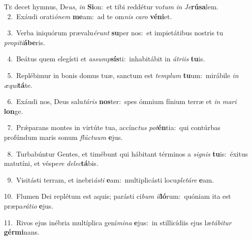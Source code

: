 \lettrine{\initial\textcolor{\initialcolor}{T}}{e} decet hymnus, De\-\textit{us}\-, \textit{in} \textbf{Si}\-on:~\star et tibi reddétur vo\textit{tum} \textit{in} \textit{Je}\-\textbf{rú}\textbf{sa}lem.\\
{\numbfont\textcolor{\numbcolor}{~2.}}~Exáudi orati\-\textit{ó}\-\textit{nem} \textbf{me}\-am:~\star ad te om\textit{nis} \textit{ca}\-\textit{ro} \textbf{vé}\-\textbf{ni}et.\par
{\numbfont\textcolor{\numbcolor}{~3.}}~Verba iniquórum prævalu\-\textit{é}\-\textit{runt} \textbf{su}\-per nos:~\star et impietátibus nostris tu \textit{pro}\-\textit{pi}\textit{ti}\textbf{á}\textbf{be}ris.\par
{\numbfont\textcolor{\numbcolor}{~4.}}~Beátus quem elegísti et \textit{as}\-\textit{sump}\textbf{sís}ti:~\star inhabitábit in \textit{á}\-\textit{tri}\textit{is} \textbf{tu}\-is.\par
{\numbfont\textcolor{\numbcolor}{~5.}}~Replébimur in bonis domus tuæ, sanctum est \textit{tem}\-\textit{plum} \textbf{tu}\-um:~\star mirábile \textit{in} \textit{æ}\-\textit{qui}\textbf{tá}te.\par
{\numbfont\textcolor{\numbcolor}{~6.}}~Exáudi nos, Deus salu\-\textit{tá}\-\textit{ris} \textbf{nos}\-ter:~\star spes ómnium fínium terræ et \textit{in} \textit{ma}\-\textit{ri} \textbf{lon}\-ge.\par
{\numbfont\textcolor{\numbcolor}{~7.}}~Prǽparans montes in virtúte tua, accínc\textit{tus} \textit{pot}\-\textbf{én}tia:~\star qui contúrbas profúndum maris sonum \textit{flúc}\-\textit{tu}\textit{um} \textbf{e}\-jus.\par
{\numbfont\textcolor{\numbcolor}{~8.}}~Turbabúntur Gentes, et timébunt qui hábitant términos a \textit{si}\-\textit{gnis} \textbf{tu}\-is:~\star éxitus matutíni, et véspe\textit{re} \textit{de}\-\textit{lec}\textbf{tá}bis.\par
{\numbfont\textcolor{\numbcolor}{~9.}}~Visitásti terram, et inebri\-\textit{ás}\-\textit{ti} \textbf{e}\-am:~\star multiplicásti locu\-\textit{ple}\-\textit{tá}\textit{re} \textbf{e}\-am.\par
{\numbfont\textcolor{\numbcolor}{10.}}~Flumen Dei replétum est aquis; parásti ci\textit{bum} \textit{il}\-\textbf{ló}rum:~\star quóniam ita est præpa\-\textit{rá}\-\textit{ti}\textit{o} \textbf{e}\-jus.\par
{\numbfont\textcolor{\numbcolor}{11.}}~Rivos ejus inébria multíplica gení\-\textit{mi}\-\textit{na} \textbf{e}\-jus:~\star in stillicídiis ejus læ\-\textit{tá}\-\textit{bi}\textit{tur} \textbf{gér}\-\textbf{mi}nans.\par
